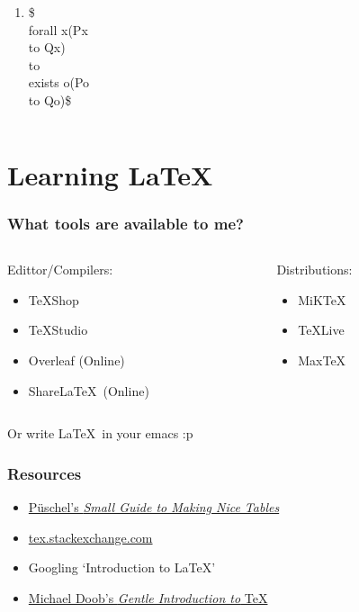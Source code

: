 \documentclass{beamer}
\begin{document}
\begin{frame}[fragile]
\begin{columns}
\begin{column}{0.55\textwidth}
\begin{enumerate}
{\begin{semiverbatim}
\begin{tiny}
				\end{tiny}\end{semiverbatim}}	
		\item {\begin{semiverbatim}\begin{tiny}
				\$\\forall x(Px \\to Qx)\\to\\exists o(Po \\to Qo)\$			
				\end{tiny}\end{semiverbatim}}
	\end{enumerate}
	\end{column}
\end{columns}
\end{frame}


\section{Learning \LaTeX}

\begin{frame}
\frametitle{What tools are available to me?}
\begin{columns}
	\begin{column}{0.5\textwidth}
Edittor/Compilers:
\begin{itemize}
	\item {\TeX Shop}
	\item {\TeX Studio}
	\item {Overleaf (Online)}
	\item {Share\LaTeX\ (Online)}
\end{itemize}
\end{column}
\begin{column}{0.5\textwidth}
	Distributions:
\begin{itemize}
	\item MiK\TeX
	\item \TeX Live
	\item Max\TeX
\end{itemize}
\end{column}
\end{columns}
Or write \LaTeX\ in your emacs :p
\end{frame}

\begin{frame}
\frametitle{Resources}
\begin{itemize}
	\item{\href{https://www.inf.ethz.ch/personal/markusp/teaching/guides/guide-tables.pdf} {P\" uschel's {\em Small Guide to Making Nice Tables}}}
	\item{\href{tex.stackexchange.com}{tex.stackexchange.com}}
	\item{Googling `Introduction to \LaTeX'}
	\item{\href{http://texdoc.net/texmf-dist/doc/plain/gentle/gentle.pdf}{Michael Doob's {\em Gentle Introduction to} \TeX}}
\end{itemize}
\end{frame}
\end{document}
